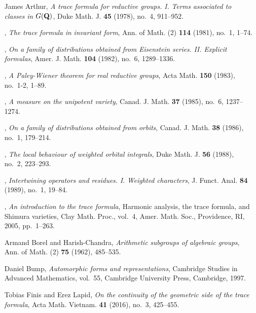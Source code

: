\documentclass{ims9x6}
\begin{document}
\begin{thebibliography}{}

James Arthur, \emph{A trace formula for reductive groups. {I}. {T}erms
  associated to classes in {$G({\bf Q})$}}, Duke Math. J. \textbf{45} (1978),
  no.~4, 911--952. 

\bysame, \emph{The trace formula in invariant form}, Ann. of Math. (2)
  \textbf{114} (1981), no.~1, 1--74. 

\bysame, \emph{On a family of distributions obtained from {E}isenstein series.
  {II}. {E}xplicit formulas}, Amer. J. Math. \textbf{104} (1982), no.~6,
  1289--1336. 

\bysame, \emph{A {P}aley-{W}iener theorem for real reductive groups}, Acta
  Math. \textbf{150} (1983), no.~1-2, 1--89. 

\bysame, \emph{A measure on the unipotent variety}, Canad. J. Math. \textbf{37}
  (1985), no.~6, 1237--1274. 

\bysame, \emph{On a family of distributions obtained from orbits}, Canad. J.
  Math. \textbf{38} (1986), no.~1, 179--214. 

\bysame, \emph{The local behaviour of weighted orbital integrals}, Duke Math.
  J. \textbf{56} (1988), no.~2, 223--293. 

\bysame, \emph{Intertwining operators and residues. {I}. {W}eighted
  characters}, J. Funct. Anal. \textbf{84} (1989), no.~1, 19--84. 

\bysame, \emph{An introduction to the trace formula}, Harmonic analysis, the
  trace formula, and {S}himura varieties, Clay Math. Proc., vol.~4, Amer. Math.
  Soc., Providence, RI, 2005, pp.~1--263. 

Armand Borel and Harish-Chandra, \emph{Arithmetic subgroups of algebraic
  groups}, Ann. of Math. (2) \textbf{75} (1962), 485--535. 

Daniel Bump, \emph{Automorphic forms and representations}, Cambridge Studies in
  Advanced Mathematics, vol.~55, Cambridge University Press, Cambridge, 1997.

Tobias Finis and Erez Lapid, \emph{On the continuity of the geometric side of
  the trace formula}, Acta Math. Vietnam. \textbf{41} (2016), no.~3, 425--455.


\end{thebibliography}
\end{document}
